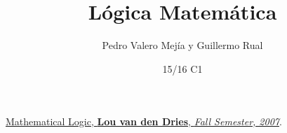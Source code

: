 \documentclass[nochap]{apuntes}
\title{Lógica Matemática}
\author{Pedro Valero Mejía y Guillermo Rual}
\date{15/16 C1}
\begin{document}
\pagestyle{plain}
\maketitle

\tableofcontents
\newpage

\newpage

\newpage

\newpage



\appendix










\newpage
\begin{thebibliography}{}

	\href{http://www.math.uiuc.edu/~henson/Math570/Fall2009/Math570notes.pdf}{Mathematical Logic,
	\textbf{Lou van den Dries},
	\emph{Fall Semester,
	2007}}.

\end{thebibliography}

\printindex
\end{document}
